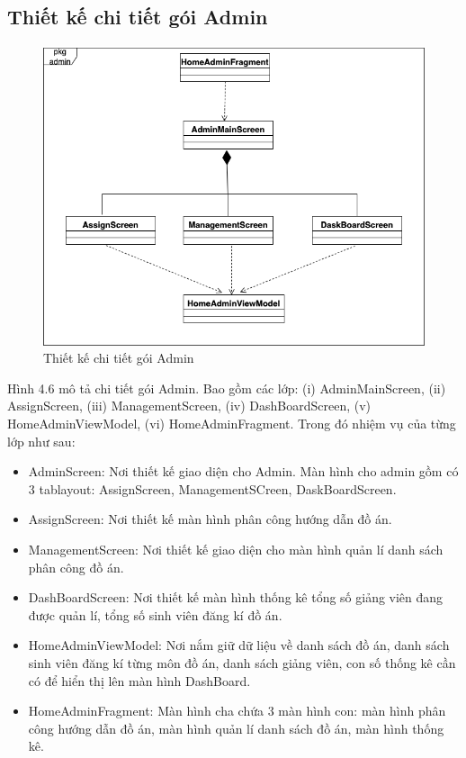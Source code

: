 \documentclass[../Main.tex]{subfiles}
\begin{document}
\subsection{Thiết kế chi tiết gói Admin} 
\begin{figure}[H]
    \centering
    \includegraphics[width=0.75\linewidth]{Figure/package_diagram_admin.png}
    \caption{Thiết kế chi tiết gói Admin}
    \label{fig:use_case_tổng_quan}
\end{figure}
Hình 4.6 mô tả chi tiết gói Admin. Bao gồm các lớp: (i) AdminMainScreen, (ii) AssignScreen, (iii) ManagementScreen, (iv) DashBoardScreen, (v) HomeAdminViewModel, (vi) HomeAdminFragment. Trong đó nhiệm vụ của từng lớp như sau:
\begin{itemize}
    \item AdminScreen: Nơi thiết kế giao diện cho Admin. Màn hình cho admin gồm có 3 tablayout: AssignScreen, ManagementSCreen, DaskBoardScreen.
    \item AssignScreen: Nơi thiết kế màn hình phân công hướng dẫn đồ án.
    \item ManagementScreen: Nơi thiết kế giao diện cho màn hình quản lí danh sách phân công đồ án. 
    \item DashBoardScreen: Nơi thiết kế màn hình thống kê tổng số giảng viên đang được quản lí, tổng số sinh viên đăng kí đồ án. 
    \item HomeAdminViewModel: Nơi nắm giữ dữ liệu về danh sách đồ án, danh sách sinh viên đăng kí từng môn đồ án, danh sách giảng viên, con số thống kê cần có để hiển thị lên màn hình DashBoard.
    \item HomeAdminFragment: Màn hình cha chứa 3 màn hình con: màn hình phân công hướng dẫn đồ án, màn hình quản lí danh sách đồ án, màn hình thống kê. 
\end{itemize}\newpage                                                                                                                              
\end{document}
